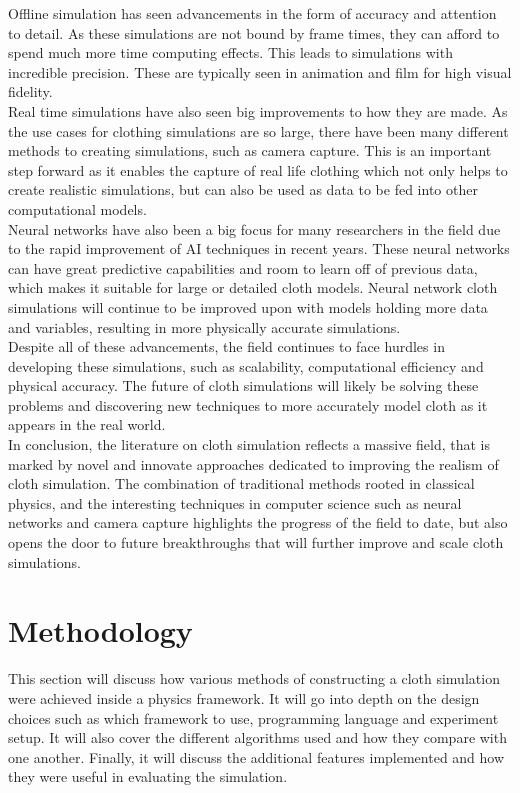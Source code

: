 \documentclass[12pt,a4paper]{article}
\begin{document}
Offline simulation has seen advancements in the form of accuracy and attention to detail. As these simulations are not bound by frame times, they can afford to spend much more time computing effects. This leads to simulations with incredible precision. These are typically seen in animation and film for high visual fidelity.
\\

Real time simulations have also seen big improvements to how they are made. As the use cases for clothing simulations are so large, there have been many different methods to creating simulations, such as camera capture. This is an important step forward as it enables the capture of real life clothing which not only helps to create realistic simulations, but can also be used as data to be fed into other computational models.
\\

Neural networks have also been a big focus for many researchers in the field due to the rapid improvement of AI techniques in recent years. These neural networks can have great predictive capabilities and room to learn off of previous data, which makes it suitable for large or detailed cloth models. Neural network cloth simulations will continue to be improved upon with models holding more data and variables, resulting in more physically accurate simulations.
\\

Despite all of these advancements, the field continues to face hurdles in developing these simulations, such as scalability, computational efficiency and physical accuracy. The future of cloth simulations will likely be solving these problems and discovering new techniques to more accurately model cloth as it appears in the real world.
\\

In conclusion, the literature on cloth simulation reflects a massive field, that is marked by novel and innovate approaches dedicated to improving the realism of cloth simulation. The combination of traditional methods rooted in classical physics, and the interesting techniques in computer science such as neural networks and camera capture highlights the progress of the field to date, but also opens the door to future breakthroughs that will further improve and scale cloth simulations.
\newpage

\section{Methodology}
This section will discuss how various methods of constructing a cloth simulation were achieved inside a physics framework. It will go into depth on the design choices such as which framework to use, programming language and experiment setup. It will also cover the different algorithms used and how they compare with one another. Finally, it will discuss the additional features implemented and how they were useful in evaluating the simulation.
\end{document}
